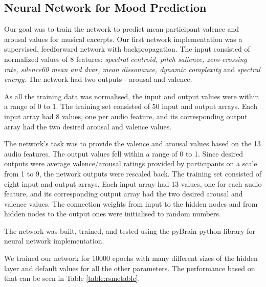 \subsection{Neural Network for Mood Prediction}



Our goal was to train the network to predict mean participant valence and arousal values for musical excerpts. 
Our first network implementation was a supervised, feedforward network with backpropagation. 
The input consisted of normalized values of 8 features:
\textit{spectral centroid, pitch salience, zero-crossing rate, silence60 mean  and dvar, mean dissonance, dynamic complexity} and \textit{spectral energy}. 
The network had two outputs - arousal and valence.

As all the training data was normalised, the input and output values were within a range of 0 to 1. The training set consisted of 50 input and output arrays. Each input array had 8 values, one per audio feature, and its corresponding output array had the two desired arousal and valence values.

The network’s task was to provide the valence and arousal values based on the 13 audio features. The output values fell within a range of 0 to 1. Since desired outputs were average valence/arousal ratings provided by participants on a scale from 1 to 9, the network outputs were rescaled back. The training set consisted of eight input and output arrays. Each input array had 13 values, one for each audio feature, and its corresponding output array had the two desired arousal and valence values. The connection weights from input to the hidden nodes and from hidden nodes to the output ones were initialised to random numbers. 

The network was built, trained, and tested using the pyBrain python library for neural network implementation. 

We trained our network for 10000 epochs with many different sizes of the hidden layer and default values for all the other parameters. The performance based on that can be seen in Table \ref{table:rsmetable}.

